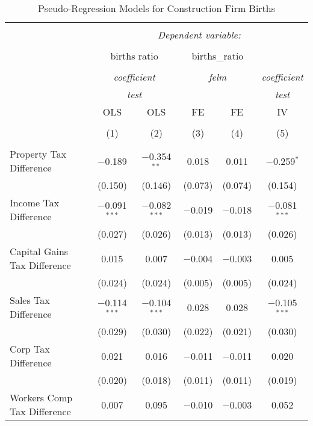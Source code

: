 
\begin{table}[!htbp] \centering 
  \caption{Pseudo-Regression Models for  Construction Firm Births} 
  \label{} 
\begin{tabular}{@{\extracolsep{5pt}}lccccc} 
\\[-1.8ex]\hline 
\hline \\[-1.8ex] 
 & \multicolumn{5}{c}{\textit{Dependent variable:}} \\ 
\cline{2-6} 
\\[-1.8ex] & \multicolumn{2}{c}{births ratio} & \multicolumn{2}{c}{births\_ratio} &   \\ 
\\[-1.8ex] & \multicolumn{2}{c}{\textit{coefficient}} & \multicolumn{2}{c}{\textit{felm}} & \textit{coefficient} \\ 
 & \multicolumn{2}{c}{\textit{test}} & \multicolumn{2}{c}{\textit{}} & \textit{test} \\ 
 & OLS & OLS & FE & FE & IV \\ 
\\[-1.8ex] & (1) & (2) & (3) & (4) & (5)\\ 
\hline \\[-1.8ex] 
 Property Tax Difference & $-$0.189 & $-$0.354$^{**}$ & 0.018 & 0.011 & $-$0.259$^{*}$ \\ 
  & (0.150) & (0.146) & (0.073) & (0.074) & (0.154) \\ 
  Income Tax Difference & $-$0.091$^{***}$ & $-$0.082$^{***}$ & $-$0.019 & $-$0.018 & $-$0.081$^{***}$ \\ 
  & (0.027) & (0.026) & (0.013) & (0.013) & (0.026) \\ 
  Capital Gains Tax Difference & 0.015 & 0.007 & $-$0.004 & $-$0.003 & 0.005 \\ 
  & (0.024) & (0.024) & (0.005) & (0.005) & (0.024) \\ 
  Sales Tax Difference & $-$0.114$^{***}$ & $-$0.104$^{***}$ & 0.028 & 0.028 & $-$0.105$^{***}$ \\ 
  & (0.029) & (0.030) & (0.022) & (0.021) & (0.030) \\ 
  Corp Tax Difference & 0.021 & 0.016 & $-$0.011 & $-$0.011 & 0.020 \\ 
  & (0.020) & (0.018) & (0.011) & (0.011) & (0.019) \\ 
  Workers Comp Tax Difference & 0.007 & 0.095 & $-$0.010 & $-$0.003 & 0.052 \\ 

\end{tabular}
\end{table}
